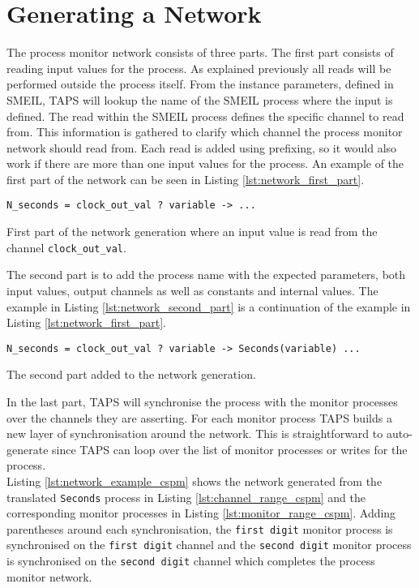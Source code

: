 \section{Generating a \cspm{} Network}
The process monitor network consists of three parts. The first part consists of reading input values for the process. As explained previously all reads will be performed outside the process itself. From the instance parameters, defined in SMEIL, TAPS will lookup the name of the SMEIL process where the input is defined. The read within the SMEIL process defines the specific channel to read from. This information is gathered to clarify which \cspm{} channel the process monitor network should read from. Each read is added using prefixing, so it would also work if there are more than one input values for the process. An example of the first part of the network can be seen in Listing \ref{lst:network_first_part}.
\begin{listing}
\begin{verbatim}
N_seconds = clock_out_val ? variable -> ...
\end{verbatim}
\caption{First part of the network generation where an input value is read from the channel \texttt{clock\_out\_val}.}
\label{lst:network_first_part}
\end{listing}
The second part is to add the process name with the expected parameters, both input values, output channels as well as constants and internal values. The example in Listing \ref{lst:network_second_part} is a continuation of the example in Listing \ref{lst:network_first_part}.
\begin{listing}
\begin{verbatim}
N_seconds = clock_out_val ? variable -> Seconds(variable) ...
\end{verbatim}
\caption{The second part added to the network generation.}
\label{lst:network_second_part}
\end{listing}

In the last part, TAPS will synchronise the process with the monitor processes over the channels they are asserting.
For each monitor process TAPS builds a new layer of synchronisation around the network. This is straightforward to auto-generate since TAPS can loop over the list of monitor processes or writes for the process. \\

Listing \ref{lst:network_example_cspm} shows the network generated from the translated \texttt{Seconds} process in Listing \ref{lst:channel_range_cspm} and the corresponding monitor processes in Listing \ref{lst:monitor_range_cspm}. Adding parentheses around each synchronisation, the \texttt{first digit} monitor process is synchronised on the \texttt{first digit} channel and the \texttt{second digit} monitor process is synchronised on the \texttt{second digit} channel which completes the process monitor network.

